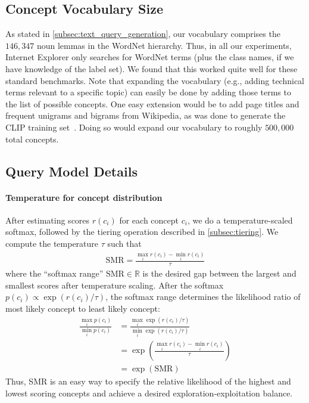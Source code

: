 \subsection{Concept Vocabulary Size}
\label{sec:concept_vocab_size}
As stated in \cref{subsec:text_query_generation}, our vocabulary comprises the $146{,}347$ noun lemmas in the WordNet hierarchy. Thus, in all our experiments, Internet Explorer only searches for WordNet terms (plus the class names, if we have knowledge of the label set). We found that this worked quite well for these standard benchmarks. Note that expanding the vocabulary (e.g., adding technical terms relevant to a specific topic) can easily be done by adding those terms to the list of possible concepts. One easy extension would be to add page titles and frequent unigrams and bigrams from Wikipedia, as was done to generate the CLIP training set~\cite{radford2021learning}. Doing so would expand our vocabulary to roughly $500{,}000$ total concepts. 

\subsection{Query Model Details}
\label{sec:query_model_details}
\paragraph{Temperature for concept distribution}
After estimating scores $r(c_i)$ for each concept $c_i$, we do a temperature-scaled softmax, followed by the tiering operation described in \cref{subsec:tiering}. We compute the temperature $\tau$ such that 
\begin{align}
     \text{SMR} = \frac{\max_i r(c_i) - \min_i r(c_i)}{\tau}
\end{align}
where the ``softmax range'' $\text{SMR} \in \mathbb R$ is the desired gap between the largest and smallest scores after temperature scaling. After the softmax $p(c_i) \propto \exp(r(c_i) / \tau)$, the softmax range determines the likelihood ratio of most likely concept to least likely concept: 
\begin{align}
    \frac{\max_i p(c_i)}{\min_i p(c_i)} &= \frac{\max_i \exp(r(c_i) / \tau)}{\min_i \exp(r(c_i) / \tau)} \\
      &= \exp \left(\frac{\max_i r(c_i) - \min_i r(c_i)}{\tau}\right) \\
    &= \exp(\text{SMR})
\end{align}
Thus, SMR is an easy way to specify the relative likelihood of the highest and lowest scoring concepts and achieve a desired exploration-exploitation balance. 



